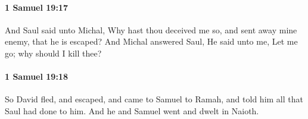 		\paragraph{1 Samuel 19:17} %
			\label{1SAMUEL-19-17}

			And Saul said unto Michal, Why hast thou deceived me so, and sent away mine enemy, that he is escaped? And Michal answered Saul, He said unto me, Let me go; why should I kill thee?


		\paragraph{1 Samuel 19:18} %
			\label{1SAMUEL-19-18}

			So David fled, and escaped, and came to Samuel to Ramah, and told him all that Saul had done to him. And he and Samuel went and dwelt in Naioth.


